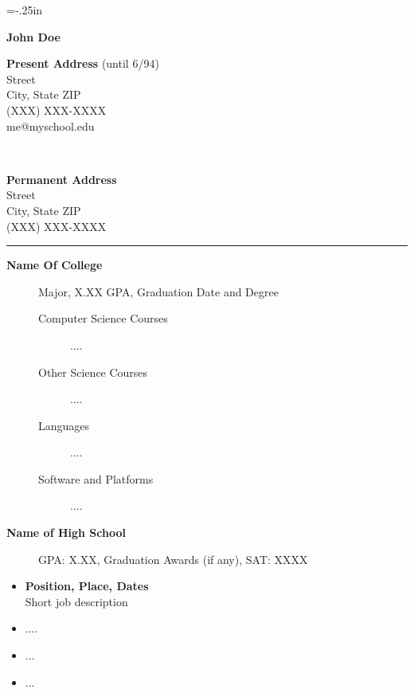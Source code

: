 
\oddsidemargin=-.25in
\textwidth=6.75in
\textheight=9.25in
\headsep=-1.5cm		
\pagestyle{empty}


\begin{center}
{\LARGE\bf John Doe}

\vspace{0.4in}

\parbox[t]{2.0in}{{\bf Present Address} (until 6/94) \\
		Street \\
		City, State ZIP \\
		(XXX) XXX-XXXX \\
		me@myschool.edu} \ \hfill \
\parbox[t]{1.51in}{{\bf Permanent Address} \\
		Street \\
		City, State ZIP\\
		(XXX) XXX-XXXX}
\end{center}

\hrule %
\vspace{0.25in}

\begin{description}
	\item[\bf Name Of College] Major, X.XX GPA, Graduation Date
		and Degree
	\begin{description}

		\item[Computer Science Courses] ....

	        \item[Other Science Courses] ....

		\item[Languages] ....

		\item[Software and Platforms] ....

	\end{description}
	\item[\bf Name of High School] GPA: X.XX, Graduation Awards (if any), 
	SAT: XXXX
\end{description}

\begin{itemize}

\item {\bf Position, Place, Dates \\}
		Short job description
\item {.... }		
\end{itemize}
\begin{itemize}
	\item ...
	\item ...
\end{itemize}


